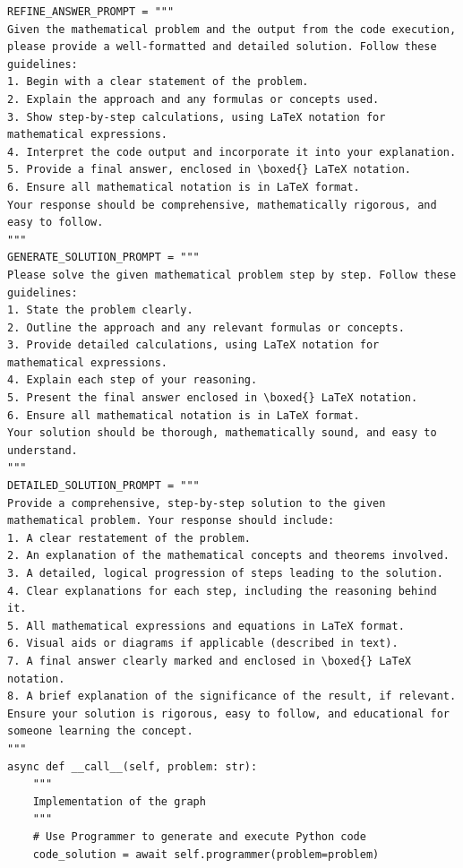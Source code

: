 \documentclass{article} %
\theoremstyle{plain}
\theoremstyle{definition}
\theoremstyle{remark}
\begin{document}
\begin{tcolorbox}[title={\textbf{\small The optimal workflow generated for MATH}}, boxrule=1pt, arc=0mm, colback=black!5!white, colframe=black!75!white, breakable, before skip=10pt, after skip=10pt, pad at break=2mm, parbox=false] \begin{verbatim}
REFINE_ANSWER_PROMPT = """
Given the mathematical problem and the output from the code execution, please provide a well-formatted and detailed solution. Follow these guidelines:
1. Begin with a clear statement of the problem.
2. Explain the approach and any formulas or concepts used.
3. Show step-by-step calculations, using LaTeX notation for mathematical expressions.
4. Interpret the code output and incorporate it into your explanation.
5. Provide a final answer, enclosed in \boxed{} LaTeX notation.
6. Ensure all mathematical notation is in LaTeX format.
Your response should be comprehensive, mathematically rigorous, and easy to follow.
"""
GENERATE_SOLUTION_PROMPT = """
Please solve the given mathematical problem step by step. Follow these guidelines:
1. State the problem clearly.
2. Outline the approach and any relevant formulas or concepts.
3. Provide detailed calculations, using LaTeX notation for mathematical expressions.
4. Explain each step of your reasoning.
5. Present the final answer enclosed in \boxed{} LaTeX notation.
6. Ensure all mathematical notation is in LaTeX format.
Your solution should be thorough, mathematically sound, and easy to understand.
"""
DETAILED_SOLUTION_PROMPT = """
Provide a comprehensive, step-by-step solution to the given mathematical problem. Your response should include:
1. A clear restatement of the problem.
2. An explanation of the mathematical concepts and theorems involved.
3. A detailed, logical progression of steps leading to the solution.
4. Clear explanations for each step, including the reasoning behind it.
5. All mathematical expressions and equations in LaTeX format.
6. Visual aids or diagrams if applicable (described in text).
7. A final answer clearly marked and enclosed in \boxed{} LaTeX notation.
8. A brief explanation of the significance of the result, if relevant.
Ensure your solution is rigorous, easy to follow, and educational for someone learning the concept.
"""
async def __call__(self, problem: str):
    """
    Implementation of the graph
    """
    # Use Programmer to generate and execute Python code
    code_solution = await self.programmer(problem=problem)

\end{verbatim}
\end{tcolorbox}
\end{document}
